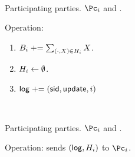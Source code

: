 \begin{protocol}~\label{prot:ConfidentialTransactions:Update}
	\item[Participating parties.] $\Pc_i$ and \Cc.
	
	\item Operation: \Cc 
	
	\begin{enumerate}
	
	\item $B_i  \mathrel{+}= \sum_{(\cdot,X) \in H_i} X$.
	
	
	\item  $H_i \leftarrow \emptyset$.
	
	\item  $\mathsf{log} \mathrel{+}= (\mathsf{sid},\mathsf{update},i)$
	
	
\end{enumerate}
	
\end{protocol}

\begin{protocol}~\label{prot:ConfidentialTransactions:History}
	\item[Participating parties.] $\Pc_i$ and \Cc.
		
	\item Operation: \Cc sends $(\mathsf{log},H_i)$ to $\Pc_i$.
	
\end{protocol}
